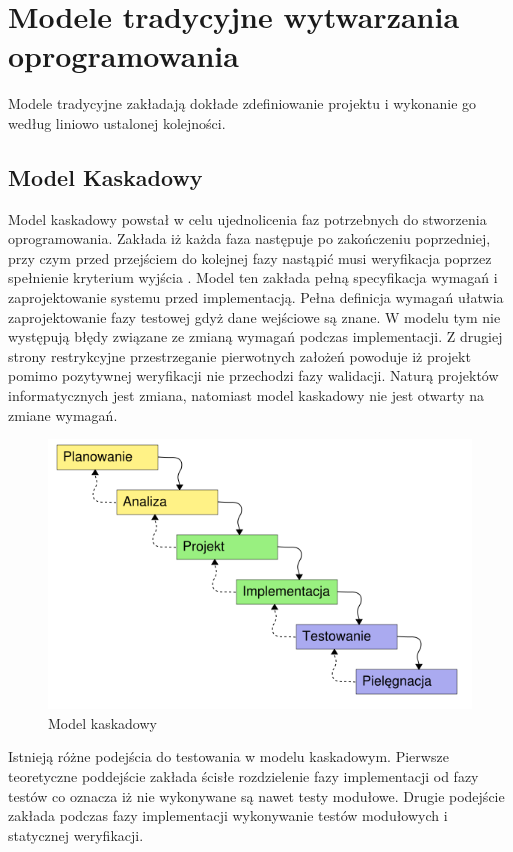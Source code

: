 \section{Modele tradycyjne wytwarzania oprogramowania}
Modele tradycyjne zakładają dokłade zdefiniowanie projektu i wykonanie go według liniowo ustalonej kolejności.
\subsection{Model Kaskadowy}
Model kaskadowy powstał w celu ujednolicenia faz potrzebnych do stworzenia oprogramowania. Zakłada iż każda faza następuje po zakończeniu poprzedniej, przy czym przed przejściem do kolejnej fazy nastąpić musi weryfikacja poprzez spełnienie kryterium wyjścia \cite{SEaT}. Model ten zakłada pełną specyfikacja wymagań i zaprojektowanie systemu przed implementacją. Pełna definicja wymagań ułatwia zaprojektowanie fazy testowej gdyż dane wejściowe są znane. W modelu tym nie występują błędy związane ze zmianą wymagań podczas implementacji. Z drugiej strony restrykcyjne przestrzeganie pierwotnych założeń powoduje iż projekt pomimo pozytywnej weryfikacji nie przechodzi fazy walidacji. Naturą projektów informatycznych jest zmiana, natomiast model kaskadowy nie jest otwarty na zmiane wymagań. 
\begin{figure}[h]
\centerline{\includegraphics[scale=0.5]{img/model_kaskadowy.png}}
\caption{Model kaskadowy}
\label{fig:kaskadowy}
\end{figure}

Istnieją różne podejścia do testowania w modelu kaskadowym. Pierwsze teoretyczne poddejście zakłada ścisłe rozdzielenie fazy implementacji od fazy testów co oznacza iż nie wykonywane są nawet testy modułowe. Drugie podejście zakłada podczas fazy implementacji wykonywanie testów modułowych i statycznej weryfikacji.

